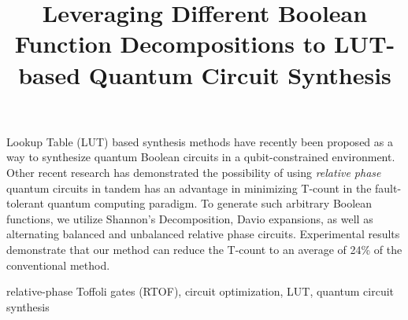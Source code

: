 \documentclass[paper]{ieice}
\title{Leveraging Different Boolean Function Decompositions to \DIFdelbegin \DIFdel{Optimize }\DIFdelend \DIFaddbegin \DIFadd{Reduce T-Count in }\DIFaddend LUT-based Quantum Circuit Synthesis}
\begin{document}
\maketitle

\begin{summary}
  Lookup Table (LUT) based synthesis methods have recently been proposed as a way to synthesize quantum Boolean circuits in a qubit-constrained environment. Other recent 
  research has demonstrated the possibility of using {\it relative phase} quantum circuits in tandem has an advantage in minimizing T-count in the fault-tolerant quantum 
  computing paradigm. To generate such arbitrary Boolean functions, we utilize Shannon's Decomposition, Davio expansions, as well as alternating balanced and unbalanced relative
  phase circuits. Experimental results demonstrate that our method can reduce the T-count
  to an average of 24\% of the conventional method. 

\end{summary}
\begin{keywords}
relative-phase Toffoli gates (RTOF), circuit optimization, LUT, quantum circuit synthesis
\end{keywords}
\setlength\textfloatsep{4pt}
\setlength\floatsep{0pt}
\setlength\abovecaptionskip{4pt}
\end{document}
